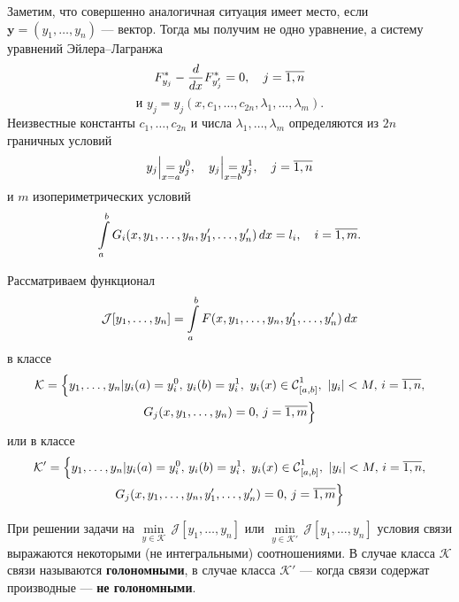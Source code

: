 \documentclass[12pt,a4paper,openany,fleqn]{book}
\newcommand{\Cf}{\ensuremath{\mathcal{C}}}
\newcommand{\J}{\ensuremath{\mathcal{J}}}
\newcommand{\mc}[1]{\ensuremath{\mathcal{#1}}}
\newcommand{\Cfn}[2][]{\ensuremath{\Cf{\mathstrut}^{#2}_{#1}}}
\newcommand{\der}[2]{\ensuremath{\frac{d#1}{d#2}}}
\newcommand{\K}{\mc{K}}
\theoremstyle{definition}
\begin{document}
\begin{enumerateD}
	Заметим, что совершенно аналогичная ситуация имеет место, если $\bm{y}=(y_1,\ldots,y_n)$ --- вектор. Тогда мы получим не одно уравнение, а систему уравнений Эйлера--Лагранжа
	\begin{equation*}
		 \hfill F^{\ast}_{y_j}-\der{}{x}F^{\ast}_{y'_j}=0,\quad j=\overline{1,n}\hfill
	\end{equation*}
	\begin{equation*}	
		\text{и }y_j=y_j(x,c_1,\ldots,c_{2n},\lambda_1,\ldots,\lambda_m).
	\end{equation*}
Неизвестные константы $c_1,\ldots,c_{2n}$ и числа $\lambda_1,\ldots,\lambda_m$ определяются из $2n$ граничных условий
\begin{equation*}
	\hfill y_j\Big|_{\lefteqn{\scriptstyle x=a}}=y_j^0,\quad y_j\Big|_{\lefteqn{\scriptstyle x=b}}=y_j^1,\quad j=\overline{1,n}\hfill
\end{equation*}
и $m$ изопериметрических условий
\begin{equation*}
	\hfill \int\limits_a^b G_i(x,y_1,\ldots,y_n,y'_1,\ldots,y'_n)\,dx=l_i,\quad i=\overline{1,m}.\hfill
\end{equation*}
\item Рассматриваем функционал 
\begin{equation*}
	\hfill\J[y_1,\ldots,y_n]=\int\limits_a^b F(x,y_1,\ldots,y_n,y'_1,\ldots,y'_n)\,dx\hfill
\end{equation*}
в классе 
\begin{multline*}
	\K=\Big\{y_1,\ldots,y_n|y_i(a)=y_i^0,\,y_i(b)=y_i^1,\ y_i(x)\in\Cfn[{[a,b]}]{1},\ |y_i|<M,\,i=\overline{1,n},\\ G_j(x,y_1,\ldots,y_n)=0,\,j=\overline{1,m}\Big\}
\end{multline*}
или в классе
\begin{multline*}
	\K'=\Big\{y_1,\ldots,y_n|y_i(a)=y_i^0,\,y_i(b)=y_i^1,\ y_i(x)\in\Cfn[{[a,b]}]{1},\ |y_i|<M,\,i=\overline{1,n},\\ G_j(x,y_1,\ldots,y_n,y'_1,\ldots,y'_n)=0,\,j=\overline{1,m}\Big\}
\end{multline*}

При решении задачи на $\min\limits_{y\in\K}\,\J[y_1,\ldots,y_n]$ или $\min\limits_{y\in\K'}\,\J[y_1,\ldots,y_n]$ условия связи выражаются некоторыми (не интегральными) соотношениями. В случае класса $\K$ связи называются \textbf{голономными}, в случае класса $\K'$ --- когда связи содержат производные --- \textbf{не голономными}.


\end{enumerateD}
\end{document}
